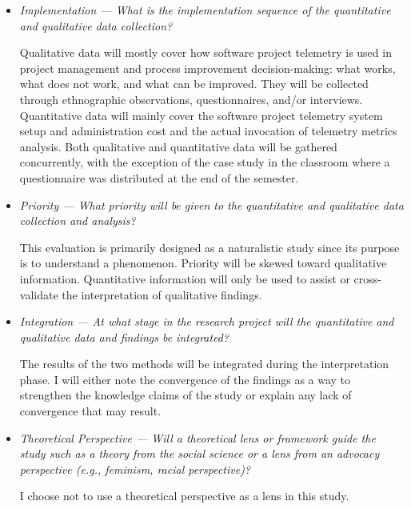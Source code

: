 \begin{itemize}
	\item \textit{Implementation --- What is the implementation sequence of the quantitative and qualitative data collection?}
		
Qualitative data will mostly cover how software project telemetry is used in project management and process improvement decision-making: what works, what does not work, and what can be improved. They will be collected through ethnographic observations, questionnaires, and/or interviews. 
Quantitative data will mainly cover the software project telemetry system setup and administration cost and the actual invocation of telemetry metrics analysis.
Both qualitative and quantitative data will be gathered concurrently, with the exception of the case study in the classroom where a questionnaire was distributed at the end of the semester.

	
	\item \textit{Priority --- What priority will be given to the quantitative and qualitative data collection and analysis?}
	
This evaluation is primarily designed as a naturalistic study since its purpose is to understand a phenomenon. Priority will be skewed toward qualitative information. Quantitative information will only be used to assist or cross-validate the interpretation of qualitative findings.
	
	
	\item \textit{Integration --- At what stage in the research project will the quantitative and qualitative data and findings be integrated?} %
	
The results of the two methods will be integrated during the interpretation phase. I will either note the convergence of the findings as a way to strengthen the knowledge claims of the study or explain any lack of convergence that may result. 
	
	
	\item \textit{Theoretical Perspective ---  Will a theoretical lens or framework guide the study such as a theory from the social science or a lens from an advocacy perspective (e.g., feminism, racial perspective)?}
	
I choose not to use a theoretical perspective as a lens in this study.

\end{itemize}


